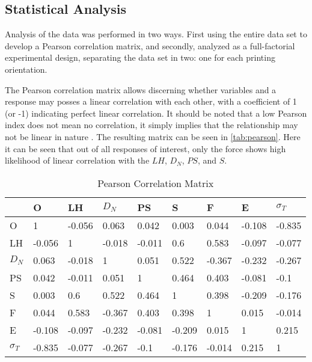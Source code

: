 \documentclass[main.tex]{subfiles}
\begin{document}
\subsection{Statistical Analysis}\label{ssec:fact}
Analysis of the data was performed in two ways. First using the entire data set to develop a Pearson correlation matrix, and secondly, analyzed as a full-factorial experimental design, separating the data set in  two: one for each printing orientation. 

The Pearson correlation matrix allows discerning whether variables and a response may posses a linear correlation with each other, with a coefficient of 1 (or -1) indicating perfect linear correlation. It should be noted that a low Pearson index does not mean no correlation, it simply implies that the relationship may not be linear in nature \cite{Geron2019}. The resulting matrix can be seen in \ref{tab:pearson}. Here it can be seen that out of all responses of interest, only the force shows high likelihood of linear correlation with the $LH$, $D_{N}$, $PS$, and $S$.

\begin{table}[!htbp]
	\renewcommand{\arraystretch}{1.5}
	\centering
	\caption{Pearson Correlation Matrix}
	\begin{tabular}{l|llllllll}
		\toprule
		& O      & LH     & $D_N$  & PS     & S      & F      & E      & $\sigma_{T}$ \\
		\midrule
		O            & 1      & -0.056 & 0.063  & 0.042  & 0.003  & 0.044  & -0.108 & -0.835       \\
		LH           & -0.056 & 1      & -0.018 & -0.011 & 0.6    & 0.583  & -0.097 & -0.077       \\
		$D_N$        & 0.063  & -0.018 & 1      & 0.051  & 0.522  & -0.367 & -0.232 & -0.267       \\
		PS           & 0.042  & -0.011 & 0.051  & 1      & 0.464  & 0.403  & -0.081 & -0.1         \\
		S            & 0.003  & 0.6    & 0.522  & 0.464  & 1      & 0.398  & -0.209 & -0.176       \\
		F            & 0.044  & 0.583  & -0.367 & 0.403  & 0.398  & 1      & 0.015  & -0.014       \\
		E            & -0.108 & -0.097 & -0.232 & -0.081 & -0.209 & 0.015  & 1      & 0.215        \\
		$\sigma_{T}$ & -0.835 & -0.077 & -0.267 & -0.1   & -0.176 & -0.014 & 0.215  & 1\\
		\bottomrule          
	\end{tabular}
\end{table} \label{tab:pearson}
\end{document}
